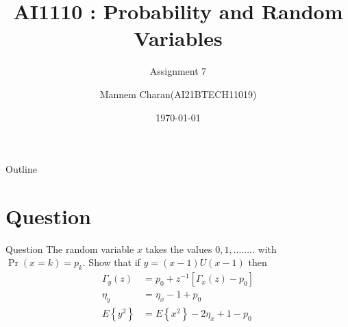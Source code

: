 \documentclass{beamer}
\title{AI1110 : Probability and Random Variables}
\subtitle{Assignment 7}
\author{Mannem Charan(AI21BTECH11019)}
\date{\today}
\providecommand{\pr}[1]{\ensuremath{\Pr\left(#1\right)}}
\providecommand{\sbrak}[1]{\ensuremath{{}\left[#1\right]}}
\providecommand{\brak}[1]{\ensuremath{\left(#1\right)}}
\providecommand{\cbrak}[1]{\ensuremath{\left\{#1\right\}}}
\begin{document}
\begin{frame}
    \titlepage 
\end{frame}


\begin{frame}{Outline}
    \tableofcontents
\end{frame}


\section{Question}
\begin{frame}{Question}
 The random variable $x$ takes the values $0,1,........$ with $\pr{x=k} = p_{k}$. Show that if $y=\brak{x-1}U\brak{x-1}$ then
   \begin{align}
                   \Gamma_{y}\brak{z} &= p_{0} + z^{-1}\sbrak{\Gamma_{x}\brak{z}-p_{0}} \nonumber\\
                     \eta_{y} &= \eta_{x}-1+p_{0} \nonumber  \\
                    E\cbrak{y^{2}} &= E\cbrak{x^{2}} - 2\eta_{x} + 1 - p_{0}\nonumber
            \end{align}
   \end{frame} 
\end{document}
